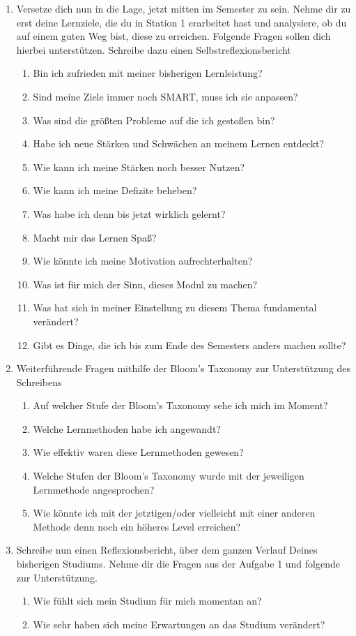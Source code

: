 \documentclass[a4paper,oneside]{scrarticle}
\begin{document}
	\begin{enumerate}
		\item Versetze dich nun in die Lage, jetzt mitten im Semester zu sein. Nehme dir zu erst deine Lernziele, die du in Station 1 erarbeitet hast und analysiere, ob du auf einem guten Weg bist, diese zu erreichen. Folgende Fragen sollen dich hierbei unterstützen. Schreibe dazu einen Selbstreflexionsbericht 
		\begin{enumerate}
			\item Bin ich zufrieden mit meiner bisherigen Lernleistung?
			\item Sind meine Ziele immer noch SMART, muss ich sie anpassen?
			\item Was sind die größten Probleme auf die ich gestoßen bin?
			\item Habe ich neue Stärken und Schwächen an meinem Lernen entdeckt?
			\item Wie kann ich meine Stärken noch besser Nutzen?
			\item Wie kann ich meine Defizite beheben?
			\item Was habe ich denn bis jetzt wirklich gelernt?
			\item Macht mir das Lernen Spaß?
			\item Wie könnte ich meine Motivation aufrechterhalten?
			\item Was ist für mich der Sinn, dieses Modul zu machen?
			\item Was hat sich in meiner Einstellung zu diesem Thema fundamental verändert?
			\item Gibt es Dinge, die ich bis zum Ende des Semesters anders machen sollte?
		\end{enumerate}
		\item Weiterführende Fragen mithilfe der Bloom's Taxonomy zur Unterstützung des Schreibens
		\begin{enumerate}
			\item Auf welcher Stufe der Bloom's Taxonomy sehe ich mich im Moment?
			\item Welche Lernmethoden habe ich angewandt?
			\item Wie effektiv waren diese Lernmethoden gewesen?
			\item Welche Stufen der Bloom's Taxonomy wurde mit der jeweiligen Lernmethode angesprochen?
			\item Wie könnte ich mit der jetztigen/oder vielleicht mit einer anderen Methode denn noch ein höheres Level erreichen?
		\end{enumerate}
		\item Schreibe nun einen Reflexionsbericht, über dem ganzen Verlauf Deines bisherigen Studiums. Nehme dir die Fragen aus der Aufgabe 1 und folgende zur Unterstützung.
		\begin{enumerate}
			\item Wie fühlt sich mein Studium für mich momentan an?
			\item Wie sehr haben sich meine Erwartungen an das Studium verändert?
		\end{enumerate}

	\end{enumerate}
\end{document}
